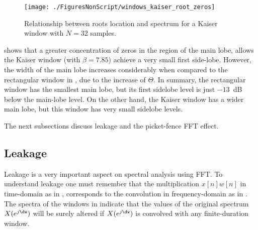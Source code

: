 \begin{figure}[htbp]
\centering
\texttt{[image: ./FiguresNonScript/windows\_kaiser\_root\_zeros]}
\caption{Relationship between roots location and spectrum for a Kaiser window with $N=32$ samples.\label{fig:windows_kaiser_root_zeros}}
\end{figure}

 shows that a greater concentration of zeros in the region of the main lobe, allows the Kaiser window (with $\beta=7.85$) achieve a very small first side-lobe. However, the width of the main lobe increases considerably when compared to the rectangular window in , due to the increase of $\Theta$.
In summary, the rectangular window has the smallest main lobe, but its first sidelobe level is just $-13$~dB below the main-lobe level. On the other hand, the Kaiser window has a wider main lobe, but this window has very small sidelobe levels.

The next subsections discuss leakage and the picket-fence FFT effect.

\subsection{Leakage}

Leakage is a very important aspect on spectral analysis using FFT. To understand leakage one must remember that the multiplication $x[n] w[n]$ in time-domain as in , corresponds to the convolution in frequency-domain as in .
The spectra of the windows in  indicate that the values of the original spectrum
$X(e^{j \dw})$ will be surely altered if $X(e^{j \dw})$ is convolved with any finite-duration window.


